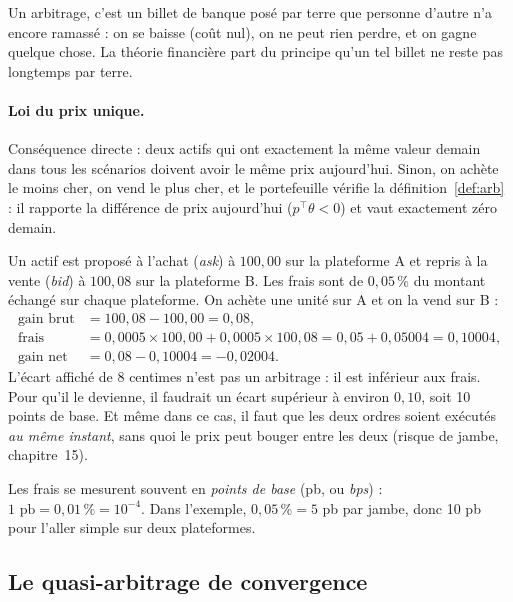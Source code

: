 \documentclass[11pt,a4paper]{article}
\begin{document}
\begin{intuition}
Un arbitrage, c'est un billet de banque posé par terre que personne d'autre n'a encore ramassé : on se baisse (coût nul), on ne peut rien perdre, et on gagne quelque chose. La théorie financière part du principe qu'un tel billet ne reste pas longtemps par terre.
\end{intuition}

\paragraph{Loi du prix unique.} Conséquence directe : deux actifs qui ont exactement la même valeur demain dans tous les scénarios doivent avoir le même prix aujourd'hui. Sinon, on achète le moins cher, on vend le plus cher, et le portefeuille vérifie la définition~\ref{def:arb} : il rapporte la différence de prix aujourd'hui ($p^\top\theta<0$) et vaut exactement zéro demain.

\begin{example}\label{ex:spatial}
Un actif est proposé à l'achat (\emph{ask}) à $100{,}00$ sur la plateforme A et repris à la vente (\emph{bid}) à $100{,}08$ sur la plateforme B. Les frais sont de $0{,}05\,\%$ du montant échangé sur chaque plateforme. On achète une unité sur A et on la vend sur B :
\begin{align*}
\text{gain brut} &= 100{,}08 - 100{,}00 = 0{,}08,\\
\text{frais} &= 0{,}0005 \times 100{,}00 + 0{,}0005 \times 100{,}08 = 0{,}05 + 0{,}05004 = 0{,}10004,\\
\text{gain net} &= 0{,}08 - 0{,}10004 = -0{,}02004.
\end{align*}
L'écart affiché de 8 centimes n'est pas un arbitrage : il est inférieur aux frais. Pour qu'il le devienne, il faudrait un écart supérieur à environ $0{,}10$, soit 10 points de base. Et même dans ce cas, il faut que les deux ordres soient exécutés \emph{au même instant}, sans quoi le prix peut bouger entre les deux (risque de jambe, chapitre~15).
\end{example}

\begin{remark}
Les frais se mesurent souvent en \emph{points de base} (pb, ou \emph{bps}) : $1\text{ pb} = 0{,}01\,\% = 10^{-4}$. Dans l'exemple, $0{,}05\,\% = 5$ pb par jambe, donc 10 pb pour l'aller simple sur deux plateformes.
\end{remark}

\subsection{Le quasi-arbitrage de convergence}
\end{document}

